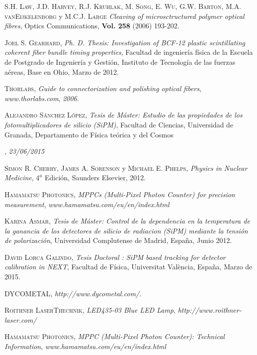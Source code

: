 \begin{thebibliography}{99}
{{{{ \textsc{S.H. Law}, \textsc{J.D. Harvey}, \textsc{R.J. Kruhlak}, \textsc{M. Song}, \textsc{E. Wu}, \textsc{G.W. Barton}, \textsc{M.A. vanEijkelenborg} y \textsc{M.C.J. Large}
\textit{Cleaving of microsctructured polymer optical fibres}, Optics Communications, \textbf{Vol. 258} (2006) 193-202.

 \textsc{Joel S. Gearhard},
\textit{ Ph. D. Thesis: Investigation of BCF-12 plastic scintillating coherent fiber bundle timing properties}, Facultad de ingeniería física de la Escuela de Postgrado de Ingeniería y Gestión, Instituto de Tecnología de las fuerzas aéreas, Base en Ohio, Marzo de 2012.

 \textsc{Thorlabs},
\textit{Guide to connectorization and polishing optical fibers}, \textit{www.thorlabs.com}, \textit{2006}.

 \textsc{Alejandro Sánchez López},
\textit{Tesis de Máster: Estudio de las propiedades de los fotomultiplicadores de silicio (SiPM)}, Facultad de Ciencias, Universidad de Granada, Departamento de Física teórica y del Cosmos}, \textit{23/06/2015}

 \textsc{Simon R. Cherry}, \textsc{James A. Sorenson} y \textsc{Michael E. Phelps},
\textit{Physics in Nuclear Medicine}, $4^a$ Edición, Saunders Elsevier, 2012.

 \textsc{Hamamatsu Photonics},
\textit{MPPCs (Multi-Pixel Photon Counter) for precision measurement}, \textit{www.hamamatsu.com/eu/en/index.html}

 \textsc{Karina Asmar},
\textit{Tesis de Máster: Control de la dependencia en la temperatura de la ganancia de los detectores de silicio de radiacion (SiPM) mediante la tensión de polarización}, Universidad Complutense de Madrid, España, Junio 2012.

 \textsc{David Lorca Galindo},
\textit{Tesis Doctoral : SiPM based tracking for detector calibration in NEXT}, Facultad de Física, Universitat  València, España, Marzo de 2015.

 \textsc{DYCOMETAL},
\textit{http://www.dycometal.com/}.

 \textsc{Roithner LaserThechnik},
\textit{LED435-03 Blue LED Lamp}, \textit{http://www.roithner-laser.com/}

 \textsc{Hamamatsu Photonics},
\textit{MPPC (Multi-Pixel Photon Counter): Technical Information}, \textit{www.hamamatsu.com/eu/en/index.html}

}}}
\end{thebibliography}
